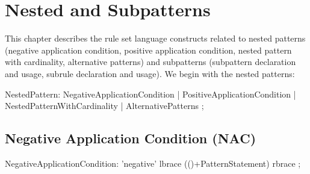 \chapter{Nested and Subpatterns}
\label{cha:nestedsub}

This chapter describes the rule set language constructs related to nested patterns (negative application condition, positive application condition, nested pattern with cardinality, alternative patterns) and subpatterns (subpattern declaration and usage, subrule declaration and usage). We begin with the nested patterns:

\begin{rail}  
  NestedPattern: 
    NegativeApplicationCondition |
    PositiveApplicationCondition |
    NestedPatternWithCardinality |
    AlternativePatterns 
    ;
\end{rail}

\section{Negative Application Condition (NAC)}
\label{nac}

\begin{rail}  
  NegativeApplicationCondition: 
    'negative' lbrace (()+PatternStatement) rbrace
    ;
\end{rail}

